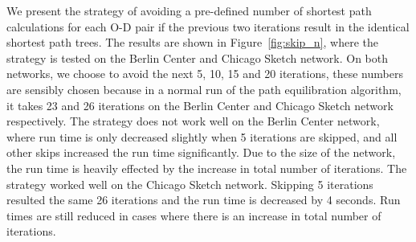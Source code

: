 We present the strategy of avoiding a pre-defined number of shortest path calculations for each O-D pair if the previous two iterations result in the identical shortest path trees.
The results are shown in Figure~\ref{fig:skip_n},
where the strategy is tested on the Berlin Center and Chicago Sketch network.
On both networks,
we choose to avoid the next 5, 10, 15 and 20 iterations,
these numbers are sensibly chosen because in a normal run of the path equilibration algorithm, it takes 23 and 26 iterations on the Berlin Center and Chicago Sketch network respectively.
The strategy does not work well on the Berlin Center network,
where run time is only decreased slightly when 5 iterations are skipped,
and all other skips increased the run time significantly.
Due to the size of the network,
the run time is heavily effected by the increase in total number of iterations.
The strategy worked well on the Chicago Sketch network.
Skipping 5 iterations resulted the same 26 iterations and the run time is decreased by 4 seconds.
Run times are still reduced in cases where there is an increase in total number of iterations.

